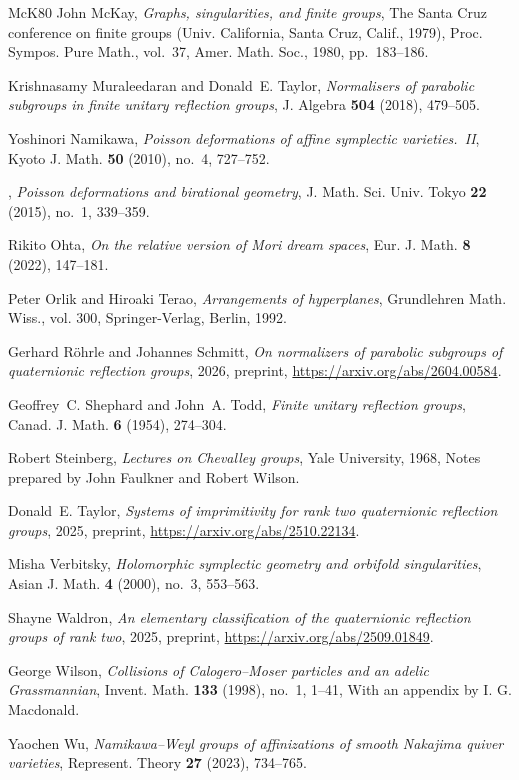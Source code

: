 \documentclass[a4paper]{amsart}
\theoremstyle{plain}
\theoremstyle{definition}
\theoremstyle{remark}
\begin{document}
\begin{thebibliography}{McK80}
	John McKay, \emph{Graphs, singularities, and finite groups}, The {S}anta {C}ruz
	conference on finite groups ({U}niv. {C}alifornia, {S}anta {C}ruz, {C}alif.,
	1979), Proc. Sympos. Pure Math., vol.~37, Amer. Math. Soc., 1980,
	pp.~183--186.
	
	Krishnasamy Muraleedaran and Donald~E. Taylor, \emph{Normalisers of parabolic
		subgroups in finite unitary reflection groups}, J. Algebra \textbf{504}
	(2018), 479--505.
	
	Yoshinori Namikawa, \emph{Poisson deformations of affine symplectic
		varieties.~{II}}, Kyoto J. Math. \textbf{50} (2010), no.~4, 727--752.
	
	\bysame, \emph{Poisson deformations and birational geometry}, J. Math. Sci.
	Univ. Tokyo \textbf{22} (2015), no.~1, 339--359.
	
	Rikito Ohta, \emph{On the relative version of {Mori} dream spaces}, Eur. J.
	Math. \textbf{8} (2022), 147--181.
	
	Peter Orlik and Hiroaki Terao, \emph{Arrangements of hyperplanes}, Grundlehren
	Math. Wiss., vol. 300, Springer-Verlag, Berlin, 1992.
	
	Gerhard Röhrle and Johannes Schmitt, \emph{On normalizers of parabolic
		subgroups of quaternionic reflection groups}, 2026, preprint,
	\url{https://arxiv.org/abs/2604.00584}.
	
	Geoffrey~C. Shephard and John~A. Todd, \emph{Finite unitary reflection groups},
	Canad. J. Math. \textbf{6} (1954), 274--304.
	
	Robert Steinberg, \emph{Lectures on {C}hevalley groups}, Yale University, 1968,
	Notes prepared by John Faulkner and Robert Wilson.
	
	Donald~E. Taylor, \emph{Systems of imprimitivity for rank two quaternionic
		reflection groups}, 2025, preprint, \url{https://arxiv.org/abs/2510.22134}.
	
	Misha Verbitsky, \emph{Holomorphic symplectic geometry and orbifold
		singularities}, Asian J. Math. \textbf{4} (2000), no.~3, 553--563.
	
	Shayne Waldron, \emph{An elementary classification of the quaternionic
		reflection groups of rank two}, 2025, preprint,
	\url{https://arxiv.org/abs/2509.01849}.
	
	George Wilson, \emph{Collisions of {C}alogero--{M}oser particles and an adelic
		{G}rassmannian}, Invent. Math. \textbf{133} (1998), no.~1, 1--41, With an
	appendix by I. G. Macdonald.
	
	Yaochen Wu, \emph{Namikawa--{W}eyl groups of affinizations of smooth {N}akajima
		quiver varieties}, Represent. Theory \textbf{27} (2023), 734--765.
	
\end{thebibliography}

%
\end{document}
